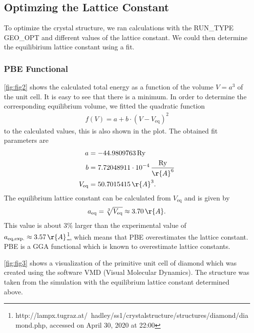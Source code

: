 \documentclass[a4paper,10pt,bibtotoc]{scrartcl}
\begin{document}
\subsection{Optimzing the Lattice Constant}
To optimize the crystal structure, we ran calculations with the RUN\_TYPE GEO\_OPT and different values of the lattice constant. We could then determine the equilibirium lattice constant using a fit.

\subsubsection{PBE Functional}
\autoref{fig:fig2} shows the calculated total energy as a function of the volume $V=a^3$ of the unit cell. It is easy to see that there is a minimum. In order to determine the corresponding equilibrium volume, we fitted the quadratic function
\begin{align}
f(V) = a + b\cdot\left(V-V_\mathrm{eq}\right)^2
\end{align}
to the calculated values, this is also shown in the plot. The obtained fit parameters are
\begin{align}
a &= -44.9809763\,\mathrm{Ry}\\
b &= 7.72048911\cdot 10^{-4}\,\frac{\mathrm{Ry}}{\r{A}^6}\\
V_\mathrm{eq} &= 50.7015415\,\r{A}^3.
\end{align}
The equilibrium lattice constant can be calculated from $V_\mathrm{eq}$ and is given by
\begin{align}
a_\mathrm{eq} = \sqrt[3]{V_\mathrm{eq}} \approx 3.70\,\r{A}.
\end{align}
This value is about 3\% larger than the experimental value of $a_\mathrm{eq,exp.} \approx 3.57\,\r{A}$\footnote{http://lampx.tugraz.at/~hadley/ss1/crystalstructure/structures/diamond/diamond.php, accessed on April 30, 2020 at 22:00}, which means that PBE overestimates the lattice constant.
PBE is a GGA functional which is known to overestimate lattice constants.

\autoref{fig:fig3} shows a visualization of the primitive unit cell of diamond which was created using the software VMD (Visual Molecular Dynamics). The structure was taken from the simulation with the equilibrium lattice constant determined above.
\end{document}
